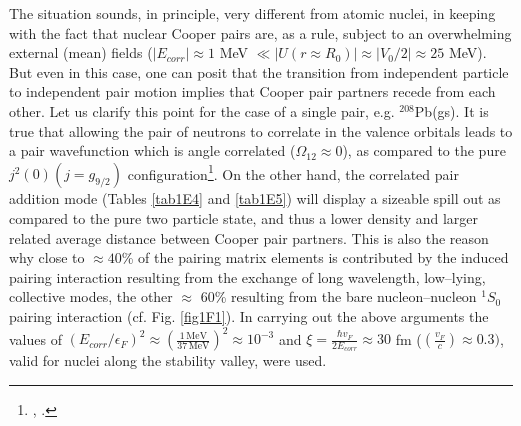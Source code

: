 The situation sounds, in principle, very different from atomic nuclei, in keeping with the fact that nuclear Cooper pairs are, as a rule, subject to an overwhelming external (mean) fields ($|E_{corr}|\approx 1$ MeV $\ll |U(r\approx R_0)|\approx |V_0/2|\approx 25 $ MeV). But even in this case, one can posit that the transition from independent particle to independent pair motion implies that Cooper pair partners recede from each other. Let us clarify this point for the case of a single pair, e.g. $^{208}$Pb(gs). It is true that allowing the pair of neutrons to correlate in the valence orbitals leads to a pair wavefunction which is angle correlated ($\Omega_{12}\approx 0$), as compared to the pure $j^2(0)(j=g_{9/2})$ configuration\footnote{\cite{Bertsch:67}, \cite{Ferreira:84,Matsuo:13}.}. On the other hand, the correlated pair addition mode (Tables \ref{tab1E4} and \ref{tab1E5}) will display a sizeable spill out as compared to the pure two particle state, and thus a lower density and larger related average distance between Cooper pair partners. This is also the reason why close to $\approx 40$\% of the pairing matrix elements is contributed by the induced pairing interaction resulting from the exchange of long wavelength, low--lying, collective modes, the other $\approx$ 60\% resulting from the bare nucleon--nucleon $^1S_0$ pairing interaction (cf. Fig. \ref{fig1F1}). In carrying out the above arguments the values of $(E_{corr}/\epsilon_F)^2\approx \left(\frac{1 \,\text{MeV}}{37\,\text{MeV}}\right)^2\approx 10^{-3}$ and $\xi=\frac{\hbar v_F}{2E_{corr}}\approx 30$ fm ($(\frac{v_F}{c})\approx 0.3)$, valid for nuclei along the stability valley, were used.


